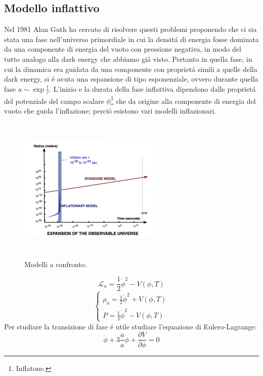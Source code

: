 \documentclass[12pt, a4paper]{article}
\begin{document}
\subsection{Modello inflattivo}
Nel 1981 Alan Guth ha cercato di risolvere questi problemi proponendo che ci sia stata una fase nell’universo primordiale in cui la densit\'{a} di energia fosse dominata da una componente di energia del vuoto con pressione negativa, in modo del tutto analogo alla dark energy che abbiamo gi\'{a} visto. Pertanto in quella fase, in cui la dinamica era guidata da una componente con propriet\'{a} simili a quelle della dark energy, si \'{e} avuta una espansione di tipo esponenziale, ovvero durante quella fase $a\sim \exp{\frac{t}{\tau}}$. L’inizio e la durata della fase inflattiva dipendono dalle propriet\'{a} del potenziale del campo scalare $\phi$\footnote{Inflatone.} che da origine alla componente di energia del vuoto che guida l’inflazione; perci\'{o} esistono vari modelli inflazionari.
\begin{figure}[htp]
    \centering
    \includegraphics[width=7cm, height=7cm]{images/inflation.png}
    \caption{Modelli a confronto.}
    \label{fig:inflazione}
\end{figure}
\begin{equation}
\mathcal{L}_{\phi}=\frac{1}{2}\dot{\phi}^2-V(\phi,T)
\end{equation}
\begin{equation}
\begin{cases}
\rho_{\phi}=\frac{1}{2}\dot{\phi}^2+V(\phi,T)
\\
P=\frac{1}{2}\dot{\phi}^2-V(\phi,T)
\end{cases}
\end{equation}
Per studiare la transizione di fase \'{e} utile studiare l'equazione di Eulero-Lagrange:
\begin{equation}
\ddot{\phi}+3\frac{\dot{a}}{a}\dot{\phi}+\frac{\partial V}{\partial \phi}=0
\end{equation}
\end{document}
